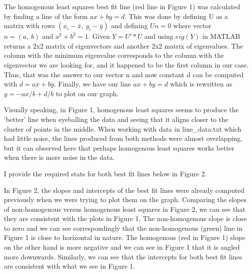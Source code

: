 \documentclass[12pt]{report}
\begin{document}
\begin{enumerate}
  The homogenous least squares best fit line (red line in Figure 1) was calculated
  by finding a line of the form $ax+by=d$. This was done by defining U as a
  matrix with rows $(x_i - \bar{x},\ y_i - \bar{y})$ and defining $Un=0$ where
  vector $n=(a,\ b)$ and $a^2+b^2=1$. Given $Y=U'*U$ and using $eig(Y)$ in
  MATLAB returns a 2x2 matrix of eigenvectors and another 2x2 matrix of
  eigenvalues.  The column with the minimum eigenvalue corresponds to the column
  with the eigenvector we are looking for, and it happened to be the first
  column in our case. Thus, that was the answer to our vector n and now constant
  d can be computed with $d=a\bar{x} + b\bar{y}$.  Finally, we have our line
  $ax+by=d$ which is rewritten as $y = -ax/b + d/b$ to plot on our graph.
  
  Visually speaking, in Figure 1, homogenous least squares seems to produce the
  'better' line when eyeballing the data and seeing that it aligns closer to the
  cluster of points in the middle. When working with data in line\_data.txt
  which had little noise, the lines produced from both methods were almost
  overlapping, but it can observed here that perhaps homogenous least squares
  works better when there is more noise in the data.
  
  \newpage
  I provide the required stats for both best fit lines below in Figure 2.
  
  \begin{figure}[h!]
    \centering
  \end{figure}
  In Figure 2, the slopes and intercepts of the best fit lines were already
  computed previously when we were trying to plot them on the graph. Comparing
  the slopes of non-homogenous versus homogenous least squares in Figure 2, we
  can see that they are consistent with the plots in Figure 1. The
  non-homogenous slope is close to zero and we can see correspondingly that the
  non-homogenous (green) line in Figure 1 is close to horizontal in nature. The
  homogenous (red in Figure 1) slope on the other hand is more negative and we
  can see in Figure 1 that it is angled more downwards. Similarly, we can see
  that the intercepts for both best fit lines are consistent with what we see in
  Figure 1.
  

\end{enumerate}
\end{document}
